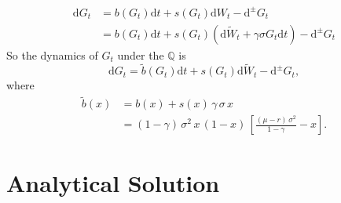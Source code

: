 \begin{equation*}
%
\begin{split}
\mathrm{d}G_t&=b(G_t)\mathrm{d}t+s(G_t)\mathrm{d}W_t-\mathrm{d}^{\pm} G_t\\
&=b(G_t)\mathrm{d}t+s(G_t)(\mathrm{d}\widetilde{W}_t+\gamma\sigma G_t\mathrm{d}t)-\mathrm{d}^{\pm} G_t
\end{split}
\end{equation*}
So the dynamics of $G_t$ under the $\mathbb{Q}$ is 
\begin{equation}
\label{Qposition}
\mathrm{d}G_t=\widetilde{b}(G_t)\mathrm{d}t+s(G_t)\mathrm{d}\widetilde{W}_t-\mathrm{d}^{\pm} G_t,
\end{equation}
where
\begin{equation}
\begin{split}
\widetilde{b}(x)&=b(x)+s(x)\,\gamma\,\sigma\,x\\
&=(1-\gamma)\,\sigma^2\,x\,(1-x)\,[\tfrac{(\mu-r)\,\sigma^2}{1-\gamma}-x].
\end{split}
\end{equation}

\section{Analytical Solution}

